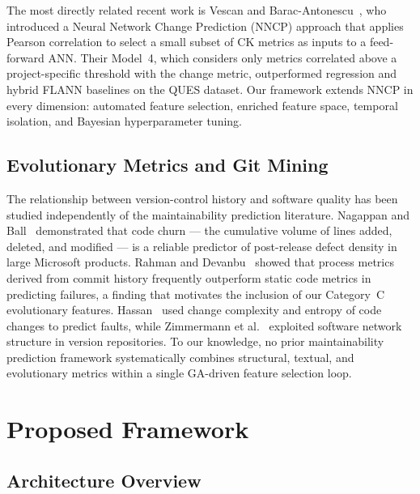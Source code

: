 \documentclass[11pt,a4paper]{article}
\begin{document}
The most directly related recent work is Vescan and Barac-Antonescu~\cite{vescan2025},
who introduced a Neural Network Change Prediction (NNCP) approach that applies
Pearson correlation to select a small subset of CK metrics as inputs to a
feed-forward ANN. Their Model~4, which considers only metrics correlated above
a project-specific threshold with the change metric, outperformed regression
and hybrid FLANN baselines on the QUES dataset. Our framework extends NNCP
in every dimension: automated feature selection, enriched feature space, temporal
isolation, and Bayesian hyperparameter tuning.

\subsection{Evolutionary Metrics and Git Mining}

The relationship between version-control history and software quality has been
studied independently of the maintainability prediction literature.
Nagappan and Ball~\cite{nagappan2005use} demonstrated that code churn --- the
cumulative volume of lines added, deleted, and modified --- is a reliable
predictor of post-release defect density in large Microsoft products.
Rahman and Devanbu~\cite{rahman2013} showed that process metrics derived from
commit history frequently outperform static code metrics in predicting failures,
a finding that motivates the inclusion of our Category~C evolutionary features.
Hassan~\cite{hassan2009predicting} used change complexity and entropy of code
changes to predict faults, while Zimmermann et al.~\cite{zimmermann2007} exploited
software network structure in version repositories. To our knowledge, no prior
maintainability prediction framework systematically combines structural, textual,
and evolutionary metrics within a single GA-driven feature selection loop.

\section{Proposed Framework}
\label{sec:framework}

\subsection{Architecture Overview}
\label{subsec:overview}
\end{document}
